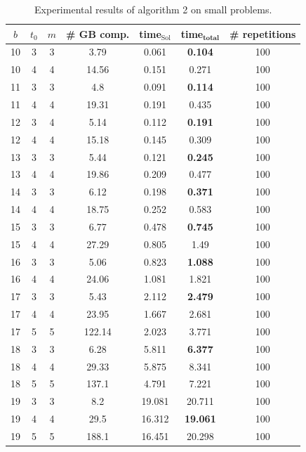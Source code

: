 \documentclass[thesis=M,english]{FITthesis}[2012/10/20]
\theoremstyle{remark}
\theoremstyle{definition}
\begin{document}
\begin{table}[H]
\centering
\begin{tabular}{ |c||c|c|c|c|c|c| } 
 \hline
$b$ & $t_0$ & $m$ & \# GB comp. & time$_\text{Sol}$ & \textbf{time}$_\textbf{total}$ & \# repetitions \\
 \hline
 \hline
10 & 3 & 3 & 3.79 & 0.061 & \textbf{0.104} & 100 \\ \hline
10 & 4 & 4 & 14.56 & 0.151 & 0.271 & 100 \\ \hline \hline
11 & 3 & 3 & 4.8 & 0.091 & \textbf{0.114} & 100 \\ \hline 
11 & 4 & 4 & 19.31 & 0.191 & 0.435 & 100 \\ \hline \hline
12 & 3 & 4 & 5.14 & 0.112 & \textbf{0.191} & 100 \\ \hline 
12 & 4 & 4 & 15.18 & 0.145 & 0.309 & 100 \\ \hline \hline
13 & 3 & 3& 5.44 & 0.121 & \textbf{0.245} & 100 \\ \hline 
13 & 4& 4 & 19.86 & 0.209 & 0.477 & 100 \\ \hline \hline
14 & 3 & 3 & 6.12 & 0.198 & \textbf{0.371} & 100 \\ \hline
14 & 4 & 4 & 18.75 & 0.252 & 0.583 & 100 \\ \hline \hline
15 & 3 & 3 & 6.77& 0.478 & \textbf{0.745} & 100 \\ \hline 
15 & 4 & 4& 27.29 & 0.805 & 1.49 & 100 \\ \hline \hline
16 & 3 & 3 & 5.06 & 0.823 & \textbf{1.088} & 100 \\ \hline 
16 & 4 & 4 & 24.06 & 1.081 & 1.821 & 100 \\ \hline \hline
17 & 3 & 3 & 5.43 & 2.112 & \textbf{2.479} & 100 \\ \hline 
17 & 4 & 4 & 23.95 & 1.667 & 2.681 & 100 \\ \hline 
17 & 5 & 5& 122.14 & 2.023 & 3.771 & 100 \\ \hline \hline
18 & 3 & 3 & 6.28 & 5.811 & \textbf{6.377} & 100 \\ \hline 
18 & 4 & 4 & 29.33 & 5.875 & 8.341 & 100 \\ \hline
18 & 5 & 5 & 137.1 & 4.791 & 7.221 & 100 \\ \hline \hline
19 & 3 & 3 & 8.2 & 19.081 & 20.711 & 100 \\ \hline 
19 & 4 & 4& 29.5 & 16.312 & \textbf{19.061} & 100 \\ \hline 
19 & 5 & 5 & 188.1 & 16.451 & 20.298 & 100 \\
 \hline
\end{tabular}
\caption[Experimental results of algorithm 2 on small problems]{Experimental results of algorithm 2 on small problems.}
\label{amad1}
\end{table}
\end{document}
